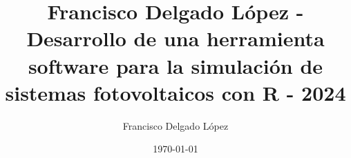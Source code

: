 \documentclass[oldfontcommands, a4paper, 11pt]{memoir}
\author{Francisco Delgado López}
\date{\today}
\title{Francisco Delgado López - Desarrollo de una herramienta software para la simulación de sistemas fotovoltaicos con R - 2024}
\begin{document}
\frontmatter






\cleardoublepage

\tableofcontents
\cleardoublepage

\listoffigures
\cleardoublepage

\listoftables

\printnomenclature{}
\cleardoublepage


\mainmatter











\appendix



\backmatter

\cleardoublepage

\printbibliography
\end{document}
